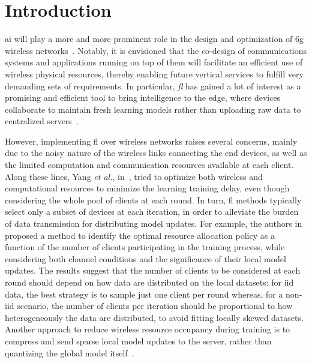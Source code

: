 \documentclass[10pt, conference, letterpaper]{IEEEtran}
\begin{document}
	\section{Introduction}
	\label{sec:intro}
	\Gls{ai}  will play a more and more prominent role in the design and optimization of \gls{6g} wireless networks~\cite{giordani2020toward}.
	Notably, it is envisioned that the co-design of communications systems and applications running on top of them will facilitate an efficient use of wireless physical resources, thereby enabling future vertical services to fulfill very demanding sets of requirements.
	In particular, \emph{\gls{fl}} has gained a lot of interest as a promising and efficient tool to bring intelligence to the edge, where devices collaborate to maintain fresh learning models rather than uploading raw data to centralized servers~\cite{BrendanMcMahan2017}.
	
	However, implementing \gls{fl} over wireless networks raises several concerns, mainly due to the noisy nature of the wireless links connecting the end devices, as well as the limited computation and communication resources available at each client. 
	Along these lines, Yang \emph{et al.}, in~\cite{Yang2020}, tried to optimize both wireless and computational resources to minimize the learning training delay, even though considering the whole pool of clients at each round. 
	In turn, \gls{fl} methods typically select only a subset of devices at each iteration, in order to alleviate the burden of data transmission for distributing model updates. 
	For example, the authors in~\cite{MMAmiri2021} proposed a method to identify the optimal resource allocation policy as a function of the number of clients participating in the training process, while considering both channel conditions and the significance of their local model updates.
	The results suggest that the number of clients to be considered at each round should depend on how data are distributed on the local datasets: for \gls{iid} data, the best strategy is to sample just one client per round whereas, for a non-\gls{iid} scenario, the number of clients per iteration should be proportional to how heterogeneously the data are distributed, to avoid fitting locally skewed datasets.
	Another approach to reduce wireless resource occupancy during training is to compress and send sparse local model updates to the server, rather than quantizing the global model itself~\cite{MMAmiriQuantized2020}. %
	
\end{document}
